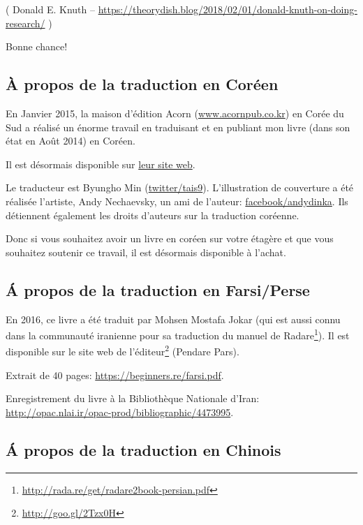 
( Donald E. Knuth -- \url{https://theorydish.blog/2018/02/01/donald-knuth-on-doing-research/} )

Bonne chance!

\subsection*{À propos de la traduction en Coréen}

En Janvier 2015, la maison d'édition Acorn (\href{http://www.acornpub.co.kr}{www.acornpub.co.kr}) en Corée du Sud a réalisé un énorme travail en traduisant et en publiant mon livre (dans son état en Août 2014) en Coréen.

Il est désormais disponible sur \href{http://go.yurichev.com/17343}{leur site web}.

Le traducteur est Byungho Min (\href{http://go.yurichev.com/17344}{twitter/tais9}).
L'illustration de couverture a été réalisée l'artiste, Andy Nechaevsky, un ami de l'auteur:
\href{http://go.yurichev.com/17023}{facebook/andydinka}.
Ils détiennent également les droits d'auteurs sur la traduction coréenne.

Donc si vous souhaitez avoir un livre  en coréen sur votre étagère et que vous souhaitez soutenir ce travail, il est désormais disponible à l'achat.

\subsection*{Á propos de la traduction en Farsi/Perse}

En 2016, ce livre a été traduit par Mohsen Mostafa Jokar (qui est aussi connu dans
la communauté iranienne pour sa traduction du manuel de Radare\footnote{\url{http://rada.re/get/radare2book-persian.pdf}}).
Il est disponible sur le site web de l'éditeur\footnote{\url{http://goo.gl/2Tzx0H}}
(Pendare Pars).

Extrait de 40 pages: \url{https://beginners.re/farsi.pdf}.

Enregistrement du livre à la Bibliothèque Nationale d'Iran: \url{http://opac.nlai.ir/opac-prod/bibliographic/4473995}.

\subsection*{Á propos de la traduction en Chinois}

